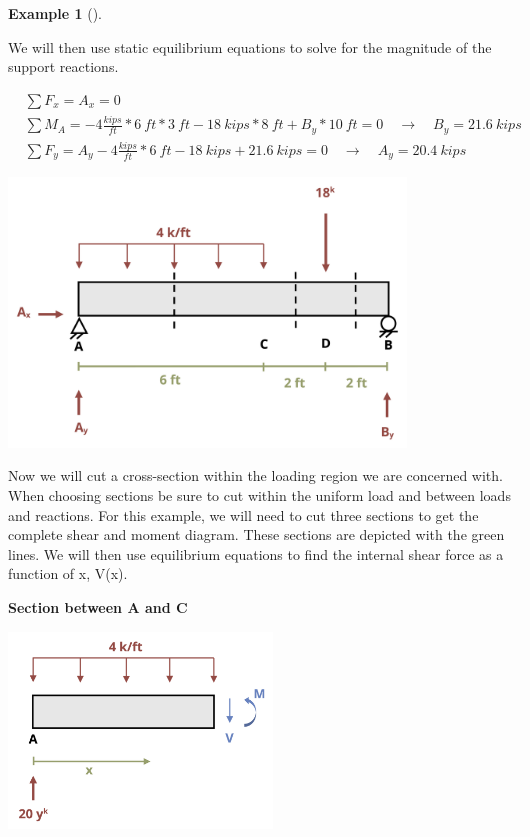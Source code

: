 \documentclass[
  letterpaper,
  DIV=11,
  numbers=noendperiod]{scrreprt}
\theoremstyle{definition}
\newtheorem{example}{Example}[chapter]
\theoremstyle{remark}
\begin{document}
\begin{tcolorbox}
\begin{example}[]
\begin{tcolorbox}
We will then use static equilibrium equations to solve for the magnitude
of the support reactions.

\[
\begin{aligned}
&\sum F_x=A_x=0 \\
&\sum M_A=-4\frac{kips}{ft}*6{~ft}*3{~ft}-18{~kips}*8{~ft}+B_y*10{~ft}=0 \quad\rightarrow\quad B_y =21.6{~kips} \\
&\sum F_y=A_y-4\frac{kips}{ft}*6{~ft}-18{~kips}+21.6{~kips}=0 \quad\rightarrow\quad A_y =20.4{~kips}
\end{aligned}
\]

\begin{center}
\includegraphics[width=4.15625in,height=\textheight]{images/CH7 PNGs/example 7.2 part 3.png}
\end{center}

Now we will cut a cross-section within the loading region we are
concerned with. When choosing sections be sure to cut within the uniform
load and between loads and reactions. For this example, we will need to
cut three sections to get the complete shear and moment diagram. These
sections are depicted with the green lines. We will then use equilibrium
equations to find the internal shear force as a function of x, V(x).

\textbf{Section between A and C}

\begin{center}
\includegraphics[width=2.76042in,height=\textheight]{images/CH7 PNGs/example 7.2 part 4.png}
\end{center}


\end{tcolorbox}
\end{example}
\end{tcolorbox}
\end{document}
